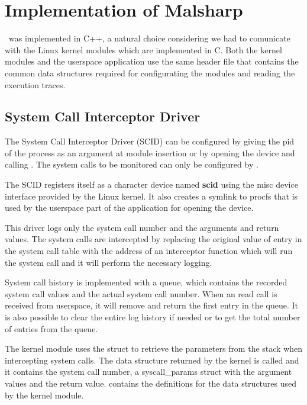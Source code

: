 \chapter{Implementation of Malsharp}
\label{chapter:fourth}

\project\ was implemented in C++, a natural choice considering we had to comunicate with the Linux kernel modules which are implemented in C. Both the kernel modules and the userspace application use the same header file that contains the common data structures required for configurating the modules and reading the execution traces.

\section{System Call Interceptor Driver}
\label{fourth:scid}

The System Call Interceptor Driver (SCID) can be configured by giving the pid of the process as an argument at module insertion or by opening the device and calling . The system calls to be monitored can only be configured by .

The SCID registers itself as a character device named \textbf{scid} using the misc device interface provided by the Linux kernel. It also creates a symlink to procfs that is used by the userspace part of the application for opening the device.

This driver logs only the system call number and the arguments and return values. The system calls are intercepted by replacing the original value of entry in the system call table with the address of an interceptor function which will run the system call and it will perform the necessary logging.

System call history is implemented with a queue, which contains the recorded system call values and the actual system call number. When an  read call is received from userspace, it will remove and return the first entry in the queue. It is also possible to clear the entire log history if needed or to get the total number of entries from the queue.

The kernel module uses the  struct to retrieve the parameters from the stack when intercepting system calls. The data structure returned by the kernel is called  and it contains the system call number, a syscall_params struct with the argument values and the return value.  contains the definitions for the data structures used by the kernel module.

